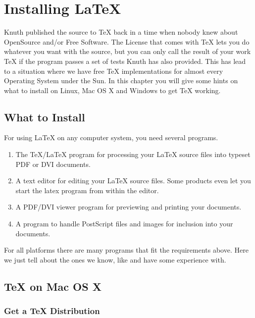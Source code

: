 \appendix
\chapter{Installing \LaTeX}
\begin{intro}
Knuth published the source to \TeX{} back in a time when nobody knew
about OpenSource and/or Free Software. The License that comes with \TeX{}
lets you do whatever you want with the source, but you can only call the
result of your work \TeX{} if the program passes a set of tests Knuth has
also provided. This has lead to a situation where we have free \TeX{}
implementations for almost every Operating System under the Sun. In this chapter
you will give some hints on what to install on Linux, Mac OS X and Windows to
get \TeX{} working.
\end{intro}

\section{What to Install}

For using LaTeX on any computer system, you need several programs.

\begin{enumerate}

\item The \TeX{}/\LaTeX{} program for processing your \LaTeX{} source files
into typeset PDF or DVI documents.

\item A text editor for editing your LaTeX source files. Some products even let
you start the latex program from within the editor.

\item A PDF/DVI viewer program for previewing and printing your
documents.

\item A program to handle PostScript files and images for inclusion into
your documents.

\end{enumerate}

For all platforms there are many programs that fit the requirements above.
Here we just tell about the ones we know, like and have some experience
with.

\section{\TeX{} on Mac OS X}

\subsection{Get a \TeX{} Distribution}

